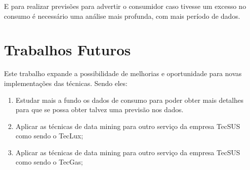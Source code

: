 \par E  para realizar previsões para advertir o consumidor caso tivesse um excesso no consumo é necessário uma análise mais profunda, com mais período de dados.


\section{Trabalhos Futuros}
\par Este trabalho expande a possibilidade de melhorias e oportunidade para novas implementações das técnicas. Sendo eles:
\begin{enumerate}
\item  Estudar mais a fundo os dados de  consumo para poder obter mais detalhes para que se possa obter talvez uma previsão nos dados.
\item  Aplicar as técnicas de data mining para outro serviço da empresa TecSUS como sendo o TecLux;
\item  Aplicar as técnicas de data mining para outro serviço da empresa TecSUS como sendo o TecGas;  
\end{enumerate}
   
   
    